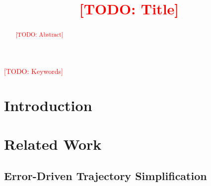 \documentclass[conference]{IEEEtran}
\newcommand{\todo}[1]{\textcolor{red}{[TODO: #1]}}
\begin{document}
\title{\todo{Title}}

\author{\IEEEauthorblockN{\todo{Authors}}
\IEEEauthorblockA{\todo{Affiliation}}}

\maketitle

\begin{abstract}
\todo{Abstract}
\end{abstract}

\begin{IEEEkeywords}
\todo{Keywords}
\end{IEEEkeywords}

\section{Introduction}
\label{sec:intro}

\section{Related Work}
\label{sec:related}

\subsection{Error-Driven Trajectory Simplification}
\label{sec:related-edts}
\end{document}
